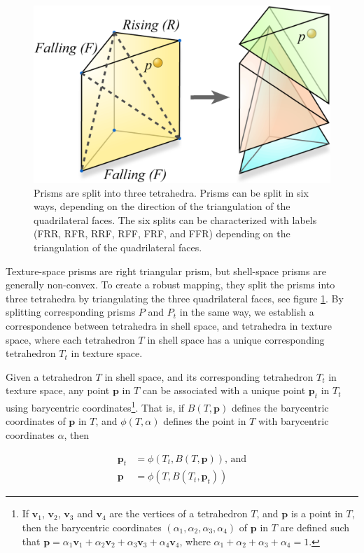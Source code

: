 \begin{figure}
\sidecaption
	\includegraphics[width=.65\textwidth]{graphics/df/shell-maps-3}		
	\caption{Prisms are split into three tetrahedra. Prisms can be split in six ways, depending on the direction of the triangulation of the quadrilateral faces. The six splits can be characterized with labels (FRR, RFR, RRF, RFF, FRF, and FFR) depending on the triangulation of the quadrilateral faces.}
	\label{f:tetrahedra}
\end{figure}

Texture-space prisms are right triangular prism, but shell-space prisms are generally non-convex. To create a robust mapping, they split the prisms into three tetrahedra by triangulating the three quadrilateral faces, see figure \ref{f:tetrahedra}. By splitting corresponding prisms $P$ and $P_{t}$ in the same way, we establish a correspondence between tetrahedra in shell space, and tetrahedra in texture space, where each tetrahedron $T$ in shell space has a unique corresponding tetrahedron $T_{t}$ in texture space.



Given a tetrahedron $T$ in shell space, and its corresponding tetrahedron $T_{t}$ in texture space, any point $\mathbf{p}$ in $T$ can be associated with a unique point $\mathbf{p}_{t}$ in $T_{t}$ using barycentric coordinates\footnote{If $\mathbf{v}_{1}$, $\mathbf{v}_{2}$, $\mathbf{v}_{3}$ and $\mathbf{v}_{4}$ are the vertices of a tetrahedron $T$, and $\mathbf{p}$ is a point in $T$, then the barycentric coordinates $(\alpha_{1},\alpha_{2},\alpha_{3},\alpha_{4})$ of $\mathbf{p}$ in $T$ are defined such that $\mathbf{p}= \alpha_{1}\mathbf{v}_{1} +\alpha_{2}\mathbf{v}_{2} +\alpha_{3}\mathbf{v}_{3} +\alpha_{4}\mathbf{v}_{4}$, where $\alpha_{1} +\alpha_{2} +\alpha_{3} +\alpha_{4} = 1$.}. That is, if $B(T,\mathbf{p})$ defines the barycentric coordinates of $\mathbf{p}$ in $T$, and $\phi(T,\alpha)$ defines the point in $T$ with barycentric coordinates $\alpha$, then

\begin{equation}
	\begin{split}
		\mathbf{p}_{t}&=\phi(T_{t},B(T,\mathbf{p})) \text{,  and} \\
		\mathbf{p}&=\phi(T,B(T_{t},\mathbf{p}_{t}))
	\end{split}
\end{equation}

